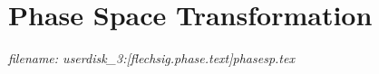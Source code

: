 

\chapter{Phase Space Transformation}   



{\it filename: userdisk\_3:[flechsig.phase.text]phasesp.tex}     

